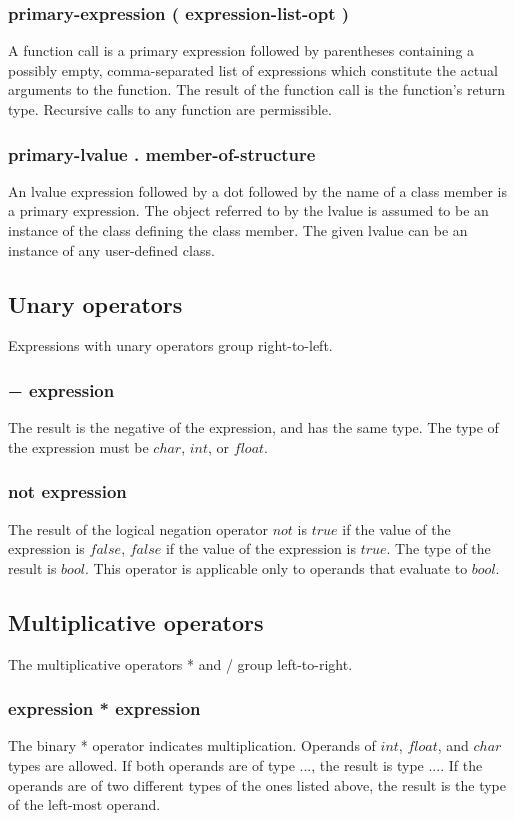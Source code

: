 \begin{homeworkProblem}
    \subsubsection{primary-expression ( expression-list-opt )}
    A function call is a primary expression followed by parentheses containing a possibly empty, comma-separated
    list of expressions which constitute the actual arguments to the function. The result of the function call is the function's return type. Recursive calls to any function are permissible.

    \subsubsection{primary-lvalue . member-of-structure}
	An lvalue expression followed by a dot followed by the name of a class member is a primary expression. The object referred to by the lvalue is assumed to be an instance of the class defining the class member. The given lvalue can be an instance of any user-defined class.

    \subsection{Unary operators}
    Expressions with unary operators group right-to-left.

    \subsubsection{− expression}
    The result is the negative of the expression, and has the same type. The type of the expression must be $char$, $int$, or $float$.

    \subsubsection{not expression}
    The result of the logical negation operator $not$ is $true$ if the value of the expression is $false$, $false$ if the value of the expression is $true$. The type of the result is $bool$. This operator is applicable only to operands that evaluate to $bool$.

    \subsection{Multiplicative operators}
    The multiplicative operators * and / group left-to-right.

    \subsubsection{expression * expression}
    The binary * operator indicates multiplication. Operands of $int$, $float$, and $char$ types are allowed. If both operands are of type ..., the result is type .... If the operands are of two different types of the ones listed above, the result is the type of the left-most operand.


\end{homeworkProblem}
